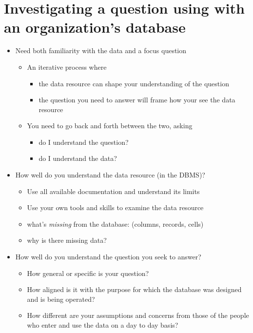 \documentclass[]{book}
\providecommand{\tightlist}{%
  \setlength{\itemsep}{0pt}\setlength{\parskip}{0pt}}
\theoremstyle{definition}
\theoremstyle{definition}
\theoremstyle{definition}
\theoremstyle{remark}
\begin{document}
\hypertarget{investigating-a-question-using-with-an-organizations-database}{%
\section{Investigating a question using with an organization's
database}\label{investigating-a-question-using-with-an-organizations-database}}

\begin{itemize}
\tightlist
\item
  Need both familiarity with the data and a focus question

  \begin{itemize}
  \tightlist
  \item
    An iterative process where

    \begin{itemize}
    \tightlist
    \item
      the data resource can shape your understanding of the question
    \item
      the question you need to answer will frame how your see the data
      resource
    \end{itemize}
  \item
    You need to go back and forth between the two, asking

    \begin{itemize}
    \tightlist
    \item
      do I understand the question?
    \item
      do I understand the data?
    \end{itemize}
  \end{itemize}
\item
  How well do you understand the data resource (in the DBMS)?

  \begin{itemize}
  \tightlist
  \item
    Use all available documentation and understand its limits
  \item
    Use your own tools and skills to examine the data resource
  \item
    what's \emph{missing} from the database: (columns, records, cells)
  \item
    why is there missing data?
  \end{itemize}
\item
  How well do you understand the question you seek to answer?

  \begin{itemize}
  \tightlist
  \item
    How general or specific is your question?
  \item
    How aligned is it with the purpose for which the database was
    designed and is being operated?
  \item
    How different are your assumptions and concerns from those of the
    people who enter and use the data on a day to day basis?
  \end{itemize}
\end{itemize}
\end{document}
